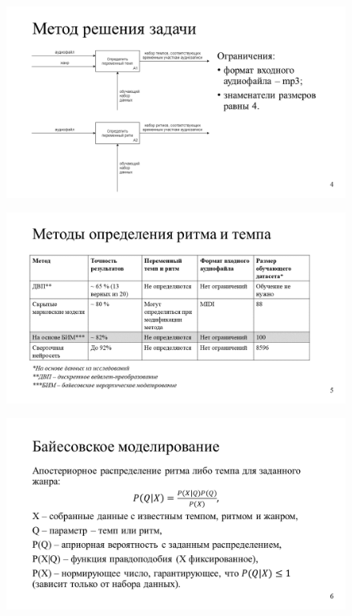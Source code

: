 \begin{figure}[h!]
	\begin{center}
		\includegraphics[angle=90,scale=0.75]{slides/Slide4.png}
	\end{center}
\end{figure}

\begin{figure}[h!]
	\begin{center}
		\includegraphics[angle=90,scale=0.75]{slides/Slide5.png}
	\end{center}
\end{figure}

\begin{figure}[h!]
	\begin{center}
		\includegraphics[angle=90,scale=0.75]{slides/Slide6.png}
	\end{center}
\end{figure}

